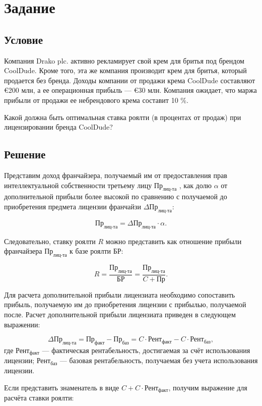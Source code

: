 \documentclass[12pt]{article}
\newenvironment{e}[1][dummy label]{
    \section{Задание}\label{#1}
    \subsection*{Условие}
    }{
    \subsection*{Решение}
}
\begin{document}
    \begin{e}
        Компания Drako plc. активно рекламирует свой крем для бритья под брендом CoolDude. Кроме того, эта же компания производит крем для бритья, который продается без бренда. Доходы компании от продажи крема CoolDude составляют €200 млн, а ее операционная прибыль --- €30 млн. Компания ожидает, что маржа прибыли от продажи ее небрендового крема составит 10 \%.

        Какой должна быть оптимальная ставка роялти (в процентах от продаж) при лицензировании бренда CoolDude?
    \end{e}

    Представим доход франчайзера, получаемый им от предоставления прав интеллектуальной собственности третьему лицу $\text{Пр}_\text{лиц-та}$ , как долю $\alpha$ от дополнительной прибыли более высокой по сравнению с получаемой до приобретения предмета лицензии франчайзи $\Delta \text{Пр}_\text{лиц-та}$:

    \begin{equation}
        \text{Пр}_\text{лиц-та} = \Delta \text{Пр}_\text{лиц-та} \cdot \alpha.
    \end{equation}

    Следовательно, ставку роялти $R$ можно представить как отношение прибыли франчайзера $\text{Пр}_\text{лиц-та}$ к базе роялти $\text{БР}$:

    \begin{equation}
        \label{eq:r-base}
        R = \frac{\text{Пр}_\text{лиц-та}}{\text{БР}} = \frac{\text{Пр}_\text{лиц-та}}{C + \text{Пр}}.
    \end{equation}

    Для расчета дополнительной прибыли лицензиата необходимо сопоставить прибыль, получаемую им до приобретения лицензии с прибылью, получаемой после. Расчет дополнительной прибыли лицензиата  приведен в следующем выражении:

    \begin{equation}
        \Delta \text{Пр}_\text{лиц-та} = \text{Пр}_\text{факт} - \text{Пр}_\text{баз} = C \cdot \text{Рент}_\text{факт} - C \cdot \text{Рент}_\text{баз},
    \end{equation}
    где $\text{Рент}_\text{факт}$ --- фактическая рентабельность, достигаемая за счёт использования лицензии; $\text{Рент}_\text{баз}$ --- базовая рентабельность, получаемая без учета использования лицензии.

    Если представить знаменатель в виде $C + C \cdot \text{Рент}_\text{факт}$, получим выражение для расчёта ставки роялти:
\end{document}
